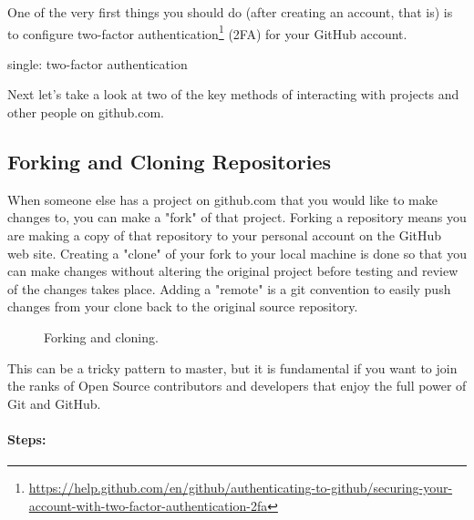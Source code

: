\justify
One of the very first things you should do (after creating an account,
that is) is to configure two-factor authentication\footnote{\url{https://help.github.com/en/github/authenticating-to-github/securing-your-account-with-two-factor-authentication-2fa}}
(2FA) for your GitHub account.

single: two-factor authentication

\justify
Next let's take a look at two of the key methods of interacting with
projects and other people on github.com.

\subsection{Forking and Cloning Repositories}
\justify
When someone else has a project on github.com that you would like to make changes to, you can make a "fork" of that project. Forking a repository means you are making a copy of that repository to your personal account on the GitHub web site.
\justify
Creating a "clone" of your fork to your local machine is done so that
you can make changes without altering the original project before testing and review of the changes takes place.
\justify
Adding a "remote" is a git convention to easily push changes from your clone back to the original source repository.

\begin{figure}[!htb]
      
      \caption{Forking and cloning.}
\end{figure}

\justify
This can be a tricky pattern to master, but it is fundamental if you
want to join the ranks of Open Source contributors and developers that
enjoy the full power of Git and GitHub.

\paragraph{Steps:}


